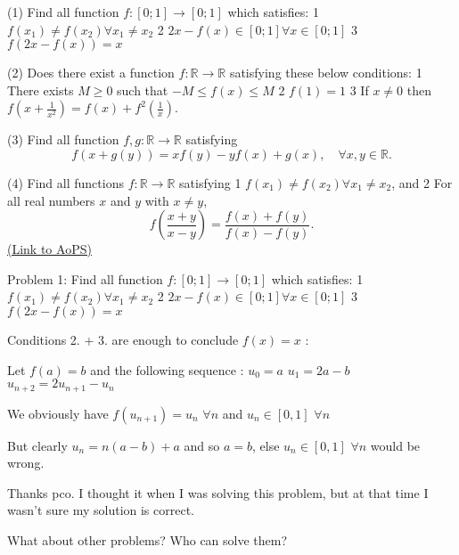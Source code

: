 \begin{problem}
	(1) Find all function $ f: [0;1] \rightarrow [0;1]$ which satisfies:
1\/ $ f(x_1) \neq f(x_2) \forall x_1 \neq x_2$
2\/ $ 2x - f(x) \in [0;1] \forall x \in [0;1]$
3\/ $ f(2x - f(x)) = x$

(2) Does there exist a function $ f: \mathbb R \rightarrow \mathbb R$ satisfying these below conditions:
1\/ There exists $ M \ge 0$ such that $ -M \le f(x) \le M$
2\/ $ f(1) = 1$
3\/ If $ x \neq 0$ then $ f(x + \frac{1}{x^2}) = f(x) + f^2(\frac{1}{x})$.

(3) Find all function $ f,g: \mathbb R \rightarrow \mathbb R$ satisfying
\[ f(x + g(y)) = xf(y) - yf(x) + g(x) , \quad \forall x,y \in \mathbb R.\]

(4) Find all functions $ f: \mathbb R \rightarrow \mathbb R$ satisfying
1\/ $ f(x_1) \neq f(x_2)  \forall x_1 \neq x_2$, and
2\/ For all real numbers $x$ and $y$ with $x \neq y$,
\[ f\left(\frac{x + y}{x - y}\right) = \frac{f(x) + f(y)}{f(x) - f(y)}.\]
	\flushright \href{https://artofproblemsolving.com/community/c6h275567}{(Link to AoPS)}
\end{problem}



\begin{solution}
	\begin{tcolorbox}Problem 1:
Find all function $ f: [0;1] \rightarrow [0;1]$ which satisfies:
1\/ $ f(x_1) \neq f(x_2) \forall x_1 \neq x_2$
2\/ $ 2x - f(x) \in [0;1] \forall x \in [0;1]$
3\/ $ f(2x - f(x)) = x$
\end{tcolorbox}

Conditions 2. + 3. are enough to conclude $ f(x) = x$ :

Let $ f(a) = b$ and the following sequence :
$ u_0 = a$
$ u_1 = 2a - b$
$ u_{n + 2} = 2u_{n + 1} - u_n$

We obviously have $ f(u_{n + 1}) = u_n$ $ \forall n$ and $ u_n\in[0,1]$ $ \forall n$

But clearly $ u_n = n(a - b) + a$ and so $ a = b$, else $ u_n\in[0,1]$ $ \forall n$ would be wrong.
\end{solution}



\begin{solution}
	Thanks pco. I thought it when I was solving this problem, but at that time I wasn't sure my solution is correct.

What about other problems? Who can solve them?
\end{solution}



